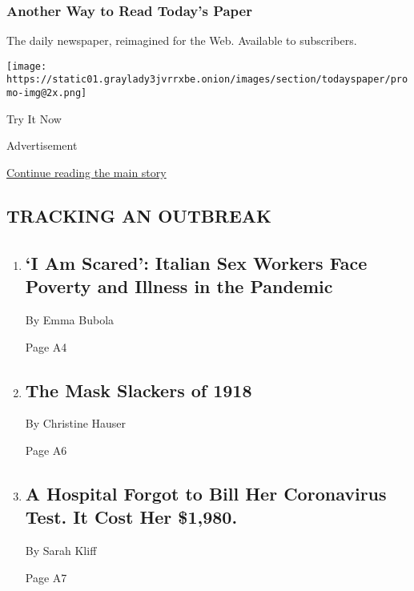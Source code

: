 \hypertarget{another-way-to-read-todays-paper}{%
\subsubsection{Another Way to Read Today's
Paper}\label{another-way-to-read-todays-paper}}

The daily newspaper, reimagined for the Web. Available to subscribers.

\texttt{[image: https://static01.graylady3jvrrxbe.onion/images/section/todayspaper/promo-img@2x.png]}

Try It Now

Advertisement

\protect\hyperlink{after-mid1}{Continue reading the main story}

\hypertarget{tracking-an-outbreak}{%
\subsection{TRACKING AN OUTBREAK}\label{tracking-an-outbreak}}

\begin{enumerate}
\def\labelenumi{\arabic{enumi}.}
\item
  \href{/2020/08/03/world/europe/italy-coronavirus-prostitution-sex-work.html}{}

  \hypertarget{i-am-scared-italian-sex-workers-face-poverty-and-illness-in-the-pandemic}{%
  \subsection{`I Am Scared': Italian Sex Workers Face Poverty and
  Illness in the
  Pandemic}\label{i-am-scared-italian-sex-workers-face-poverty-and-illness-in-the-pandemic}}

  By Emma Bubola

  Page A4
\item
  \href{/2020/08/03/us/mask-protests-1918.html}{}

  \hypertarget{the-mask-slackers-of-1918-1}{%
  \subsection{The Mask Slackers of
  1918}\label{the-mask-slackers-of-1918-1}}

  By Christine Hauser

  Page A6
\item
  \href{/2020/08/03/upshot/nj-coronavirus-medical-bill.html}{}

  \hypertarget{a-hospital-forgot-to-bill-her-coronavirus-test-it-cost-her-1980}{%
  \subsection{A Hospital Forgot to Bill Her Coronavirus Test. It Cost
  Her
  \$1,980.}\label{a-hospital-forgot-to-bill-her-coronavirus-test-it-cost-her-1980}}

  By Sarah Kliff

  Page A7
\end{enumerate}

